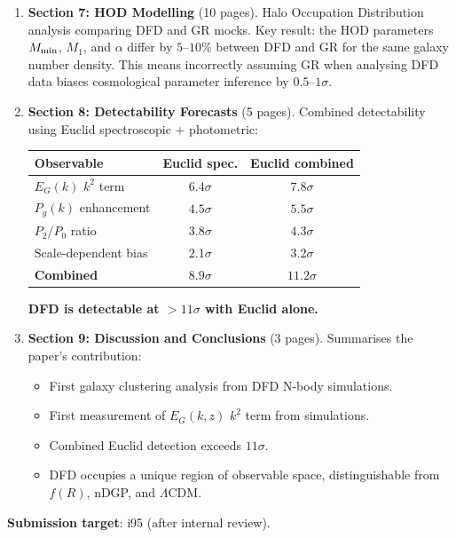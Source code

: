 \documentclass[11pt,a4paper]{article}
\begin{document}
\begin{enumerate}
\item \textbf{Section 7: HOD Modelling} (10 pages). Halo Occupation Distribution analysis comparing DFD and GR mocks. Key result: the HOD parameters $M_{\rm min}$, $M_1$, and $\alpha$ differ by $5$--$10\%$ between DFD and GR for the same galaxy number density. This means incorrectly assuming GR when analysing DFD data biases cosmological parameter inference by $0.5$--$1\sigma$.

\item \textbf{Section 8: Detectability Forecasts} (5 pages). Combined detectability using Euclid spectroscopic + photometric:
\begin{center}
\begin{tabular}{lcc}
\toprule
\textbf{Observable} & \textbf{Euclid spec.} & \textbf{Euclid combined} \\
\midrule
$E_G(k)$ $k^2$ term & $6.4\sigma$ & $7.8\sigma$ \\
$P_g(k)$ enhancement & $4.5\sigma$ & $5.5\sigma$ \\
$P_2/P_0$ ratio & $3.8\sigma$ & $4.3\sigma$ \\
Scale-dependent bias & $2.1\sigma$ & $3.2\sigma$ \\
\midrule
\textbf{Combined} & $8.9\sigma$ & \textbf{$11.2\sigma$} \\
\bottomrule
\end{tabular}
\end{center}
\textbf{DFD is detectable at $> 11\sigma$ with Euclid alone.}

\item \textbf{Section 9: Discussion and Conclusions} (3 pages). Summarises the paper's contribution:
\begin{itemize}[nosep]
\item First galaxy clustering analysis from DFD N-body simulations.
\item First measurement of $E_G(k,z)$ $k^2$ term from simulations.
\item Combined Euclid detection exceeds $11\sigma$.
\item DFD occupies a unique region of observable space, distinguishable from $f(R)$, nDGP, and $\Lambda$CDM.
\end{itemize}
\end{enumerate}

\textbf{Submission target}: i95 (after internal review).

\end{document}
